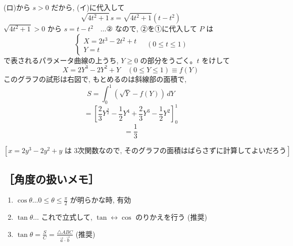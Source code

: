 \documentclass[../main.tex]{subfiles}
\begin{document}
(ロ)から $s > 0$ だから, (イ)に代入して
\[
  \sqrt{4t^2+1} \, s = \sqrt{4t^2+1} (t - t^2)
\]
$\sqrt{4t^2+1} > 0$ から $s = t - t^2 \quad \dots \text{②}$ なので, ②を①に代入して $P$ は
\[
  \begin{cases}
    X = 2t^3 - 2t^2 + t \\
    Y = t
  \end{cases} \quad (0 \le t \le 1)
\]
で表されるパラメータ曲線の上うち, $Y \ge 0$ の部分をうごく。$t$ をけして
\[
  X = 2Y^3 - 2Y^2 + Y \quad (0 \le Y \le 1) \equiv f(Y)
\]
このグラフの試形は右図で, もとめるのは斜線部の面積で,
\[
  S = \int_0^1 (\sqrt{Y} - f(Y)) \, dY
\]
\[
  = \left[ \frac{2}{3} Y^{\frac{3}{2}} - \frac{1}{2} Y^4 + \frac{2}{3} Y^3 - \frac{1}{2} Y^2 \right]_0^1
\]
\[
  = \frac{1}{3}
\]

$\left[ x = 2y^3 - 2y^2 + y \text{ は 3次関数なので, そのグラフの面積はばらさずに計算してよいだろう} \right]$

\begin{center}
\end{center}

\subsection*{［角度の扱いメモ］}

\begin{enumerate}
  \item[(1)] $\cos\theta \dots 0 \le \theta \le \frac{\pi}{2}$ が明らかな時, 有効
  \item[(2)] $\tan\theta \dots$ これで立式して, $\tan \leftrightarrow \cos$ のりかえを行う (推奨)
  \item[(3)] $\tan\theta = \frac{S}{C} = \frac{\triangle ABC}{\vec{a} \cdot \vec{b}}$ (推奨)
\end{enumerate}
\end{document}
